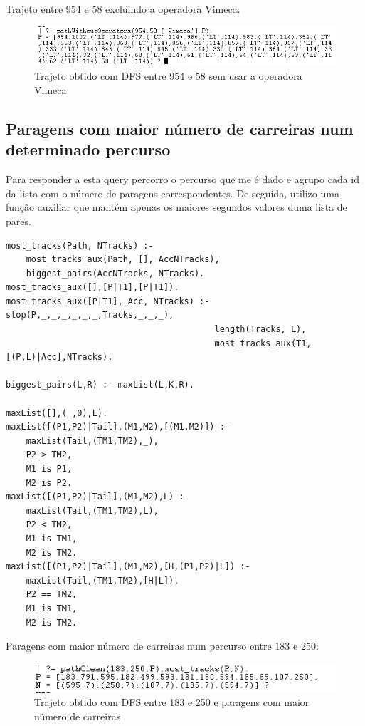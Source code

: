\documentclass[20pt]{article}
\begin{document}
Trajeto entre 954 e 58 excluindo a operadora Vimeca.
\vspace{1cm}
\begin{figure}[H]
    \centering
    \includegraphics[scale=0.8]{images/no_ops_954_58.png}
    \caption{Trajeto obtido com DFS entre 954 e 58 sem usar a operadora Vimeca}
\end{figure}

\newpage
\subsection{Paragens com maior número de carreiras num determinado percurso }
Para responder a esta query percorro o percurso que me é dado e agrupo cada id da lista com o número de paragens correspondentes. De seguida, utilizo uma função auxiliar que mantém apenas os maiores segundos valores duma lista de pares.

\begin{verbatim}
most_tracks(Path, NTracks) :- 
    most_tracks_aux(Path, [], AccNTracks), 
    biggest_pairs(AccNTracks, NTracks).
most_tracks_aux([],[P|T1],[P|T1]).
most_tracks_aux([P|T1], Acc, NTracks) :- stop(P,_,_,_,_,_,_,Tracks,_,_,_),
                                         length(Tracks, L),                                
                                         most_tracks_aux(T1,[(P,L)|Acc],NTracks).                    

biggest_pairs(L,R) :- maxList(L,K,R).

maxList([],(_,0),L).
maxList([(P1,P2)|Tail],(M1,M2),[(M1,M2)]) :- 
    maxList(Tail,(TM1,TM2),_), 
    P2 > TM2, 
    M1 is P1, 
    M2 is P2.
maxList([(P1,P2)|Tail],(M1,M2),L) :- 
    maxList(Tail,(TM1,TM2),L), 
    P2 < TM2, 
    M1 is TM1, 
    M2 is TM2.
maxList([(P1,P2)|Tail],(M1,M2),[H,(P1,P2)|L]) :- 
    maxList(Tail,(TM1,TM2),[H|L]), 
    P2 == TM2, 
    M1 is TM1, 
    M2 is TM2.
\end{verbatim}

Paragens com maior número de carreiras num percurso entre 183 e 250:
\vspace{1cm}
\begin{figure}[H]
    \centering
    \includegraphics[scale=0.8]{images/most_tracks_183_250.png}
    \caption{Trajeto obtido com DFS entre 183 e 250 e paragens com maior número de carreiras}
\end{figure}
\end{document}
